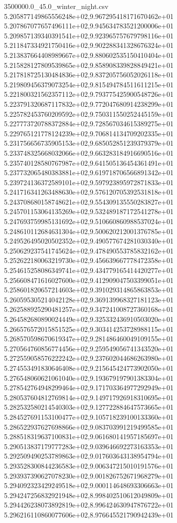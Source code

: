 \begin{filecontents*}{3500000.0_45.0_winter_night.csv}
5.205877149865556248e+02,9.967295418171670462e+01
5.207867077657496111e+02,9.945634783521200006e+01
5.209857139340391541e+02,9.923965757679798116e+01
5.211847334921750416e+02,9.902288341328676324e+01
5.213837664408989667e+02,9.880602535150410404e+01
5.215828127809539865e+02,9.858908339828849421e+01
5.217818725130484836e+02,9.837205756052026118e+01
5.219809456379073254e+02,9.815494784511611215e+01
5.221800321562357112e+02,9.793775425900548726e+01
5.223791320687117832e+02,9.772047680914238299e+01
5.225782453760209592e+02,9.750311550252445159e+01
5.227773720788372884e+02,9.728567034615389275e+01
5.229765121778124239e+02,9.706814134709202335e+01
5.231756656735905153e+02,9.685052851239379379e+01
5.233748325668032066e+02,9.663283184916690516e+01
5.235740128580767987e+02,9.641505136454361491e+01
5.237732065480383881e+02,9.619718706566891342e+01
5.239724136372589101e+02,9.597923895972871833e+01
5.241716341263488630e+02,9.576120705392531818e+01
5.243708680158748621e+02,9.554309135550283827e+01
5.245701153064135269e+02,9.532489187172541278e+01
5.247693759985131692e+02,9.510660860988537024e+01
5.248610112684631304e+02,9.500620212001376785e+01
5.249526495020502352e+02,9.490577674281030340e+01
5.250629237541745624e+02,9.478490553785832162e+01
5.252622180063219730e+02,9.456639667778472358e+01
5.254615258086349741e+02,9.434779165414420277e+01
5.256608471616027600e+02,9.412909047503399051e+01
5.258601820657214603e+02,9.391029314865863853e+01
5.260595305214042128e+02,9.369139968327181123e+01
5.262588925290481257e+02,9.347241008727360168e+01
5.264582680890024449e+02,9.325332436910503020e+01
5.266576572015851525e+02,9.303414253728988115e+01
5.268570598670619347e+02,9.281486460049109155e+01
5.270564760856774456e+02,9.259549056741343520e+01
5.272559058576222242e+02,9.237602044686263980e+01
5.274553491830646408e+02,9.215645424773902050e+01
5.276548060621061040e+02,9.193679197901383304e+01
5.278542764948299464e+02,9.171703364977292949e+01
5.280537604812769814e+02,9.149717926918310695e+01
5.282532580214540303e+02,9.127722884647573665e+01
5.284527691153100477e+02,9.105718239100133360e+01
5.286522937627698866e+02,9.083703991219499585e+01
5.288518319637100831e+02,9.061680141957185697e+01
5.290513837179777283e+02,9.039646692273163353e+01
5.292509490253789863e+02,9.017603643138954794e+01
5.293528300844236583e+02,9.006347215010191576e+01
5.293937390627078230e+02,9.001826752671968279e+01
5.294092323429249518e+02,9.000114648693306663e+01
5.294247256832921948e+02,8.998402510612049809e+01
5.294426238073892819e+02,8.996424630947876722e+01
5.296216110860077606e+02,8.976645521790942439e+01

\end{filecontents*}
